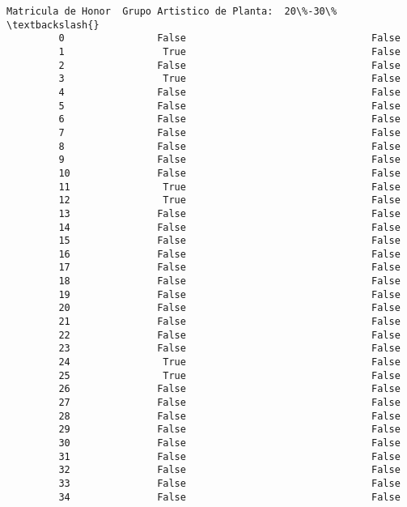 \documentclass[11pt]{article}
\begin{document}
\begin{Verbatim}[commandchars=\\\{\}]
             Matricula de Honor  Grupo Artistico de Planta:  20\%-30\%  \textbackslash{}
         0                False                                False   
         1                 True                                False   
         2                False                                False   
         3                 True                                False   
         4                False                                False   
         5                False                                False   
         6                False                                False   
         7                False                                False   
         8                False                                False   
         9                False                                False   
         10               False                                False   
         11                True                                False   
         12                True                                False   
         13               False                                False   
         14               False                                False   
         15               False                                False   
         16               False                                False   
         17               False                                False   
         18               False                                False   
         19               False                                False   
         20               False                                False   
         21               False                                False   
         22               False                                False   
         23               False                                False   
         24                True                                False   
         25                True                                False   
         26               False                                False   
         27               False                                False   
         28               False                                False   
         29               False                                False   
         30               False                                False   
         31               False                                False   
         32               False                                False   
         33               False                                False   
         34               False                                False   

\end{Verbatim}
\end{document}

